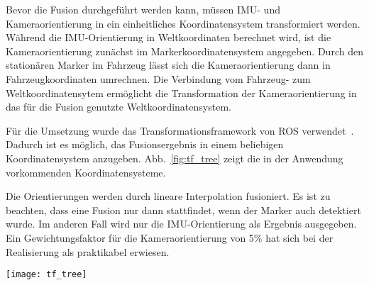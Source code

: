 Bevor die Fusion durchgeführt werden kann, müssen IMU- und Kameraorientierung in ein einheitliches Koordinatensystem transformiert werden.
Während die IMU-Orientierung in Weltkoordinaten berechnet wird, ist die Kameraorientierung zunächst im Markerkoordinatensystem angegeben.
Durch den stationären Marker im Fahrzeug lässt sich die Kameraorientierung dann in Fahrzeugkoordinaten umrechnen.
Die Verbindung vom Fahrzeug- zum Weltkoordinatensytem ermöglicht die Transformation der Kameraorientierung in das für die Fusion genutzte Weltkoordinatensystem.

Für die Umsetzung wurde das Transformationsframework von \ac{ROS} verwendet~\cite{ros_tf}.
Dadurch ist es möglich, das Fusionsergebnis in einem beliebigen Koordinatensystem anzugeben. Abb.~\ref{fig:tf_tree} zeigt die in der Anwendung vorkommenden Koordinatensysteme.

Die Orientierungen werden durch lineare Interpolation fusioniert.
Es ist zu beachten, dass eine Fusion nur dann stattfindet, wenn der Marker auch detektiert wurde.
Im anderen Fall wird nur die IMU-Orientierung als Ergebnis ausgegeben.
Ein Gewichtungsfaktor für die Kameraorientierung von 5\% hat sich bei der Realisierung als praktikabel erwiesen.

\begin{figure*}[tb]
 \centering
 \texttt{[image: tf\_tree]}
  \caption{Koordinaten-Frames}
  \label{fig:tf_tree}
\end{figure*}

